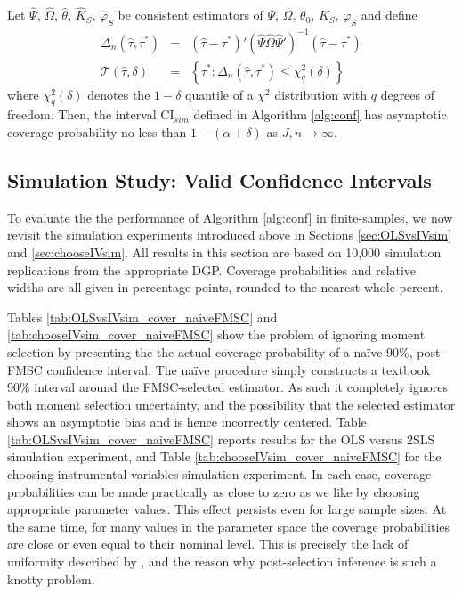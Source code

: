 \begin{thm}
\label{pro:sim}
Let $\widehat{\Psi}$, $\widehat{\Omega}$, $\widehat{\theta}$, $\widehat{K}_S$, $\widehat{\varphi}_S$ be consistent estimators of $\Psi$, $\Omega$, $\theta_0$, $K_S$, $\varphi_S$ and define 
\begin{eqnarray*}
	\Delta_n(\widehat{\tau},\tau^*) &=& \left(\widehat{\tau} - \tau^*\right)' \left(\widehat{\Psi}\widehat{\Omega}\widehat{\Psi}'\right)^{-1} \left(\widehat{\tau} - \tau^*\right)\\
	\mathscr{T}(\widehat{\tau},\delta) &=& \left\{\tau^* \colon  \Delta_n(\widehat{\tau},\tau^*) \leq \chi^2_q(\delta)\right\}
\end{eqnarray*}
where $\chi^2_q(\delta)$ denotes the $1-\delta$ quantile of a $\chi^2$ distribution with $q$ degrees of freedom.
Then, the interval $\mbox{CI}_{sim}$ defined in Algorithm \ref{alg:conf} has asymptotic coverage probability no less than $1-(\alpha + \delta)$ as $J,n\rightarrow \infty$.
\end{thm}

\subsection{Simulation Study: Valid Confidence Intervals}
To evaluate the the performance of Algorithm \ref{alg:conf} in finite-samples, we now revisit the simulation experiments introduced above in Sections \ref{sec:OLSvsIVsim} and \ref{sec:chooseIVsim}.
All results in this section are based on 10,000 simulation replications from the appropriate DGP.
Coverage probabilities and relative widths are all given in percentage points, rounded to the nearest whole percent.

Tables \ref{tab:OLSvsIVsim_cover_naiveFMSC} and \ref{tab:chooseIVsim_cover_naiveFMSC} show the problem of ignoring moment selection by presenting the the actual coverage probability of a na\"{i}ve 90\%, post-FMSC confidence interval.
The na\"{i}ve procedure simply constructs a textbook 90\% interval around the FMSC-selected estimator. 
As such it completely ignores both moment selection uncertainty, and the possibility that the selected estimator shows an asymptotic bias and is hence incorrectly centered.
Table \ref{tab:OLSvsIVsim_cover_naiveFMSC} reports results for the OLS versus 2SLS simulation experiment, and Table \ref{tab:chooseIVsim_cover_naiveFMSC} for the choosing instrumental variables simulation experiment.
In each case, coverage probabilities can be made practically as close to zero as we like by choosing appropriate parameter values.
This effect persists even for large sample sizes.
At the same time, for many values in the parameter space the coverage probabilities are close or even equal to their nominal level.
This is precisely the lack of uniformity described by \cite{LeebPoetscher2005}, and the reason why post-selection inference is such a knotty problem.


